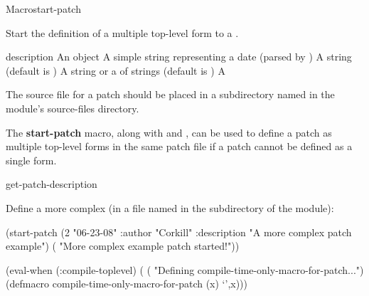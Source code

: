 \documentclass[10pt,twoside,english,pdftex]{article}
\begin{document}
\begin{functiondoc}{Macro}{start-patch}%
  {\code{(}
     \code{)}
    \superstar} 
%
%

\fnsyntax 

\fnpurpose Start the definition of a multiple top-level form  to
a .

\fnpackage {}

\fnmodule {}

\fnargs
\begin{args}{description}
\arg[id] An object
\arg[date] A simple string representing a date (parsed by 
  )
\arg[author] A string (default is )
\arg[description] A string or a  of strings (default is \nil)
\arg[form] A 
\end{args}

\fndescription 
%
The source file for a patch should be placed in a subdirectory named
 in the module's source-files directory.

The \textbf{start-patch} macro, along with
 and
, can be used to define a patch as
multiple top-level forms in the same patch file if a patch cannot be defined
as a single  form.

\begin{alsos}{get-patch-description}
\also[patch]
\also[undefmethod]
\end{alsos}

\fnexample 
%
Define a more complex  (in a file named
 in the  subdirectory of
the module):
%
%
%
%
%
\W\supp
\begin{example}
  (start-patch (2 "06-23-08" 
                  :author "Corkill"
                  :description "A more complex patch example")
      ( "More complex example patch started!"))

  (eval-when (:compile-toplevel)
    (
     ( "Defining compile-time-only-macro-for-patch...")
     (defmacro compile-time-only-macro-for-patch (x)
       `',x)))


\end{example}
\end{functiondoc}
\end{document}
